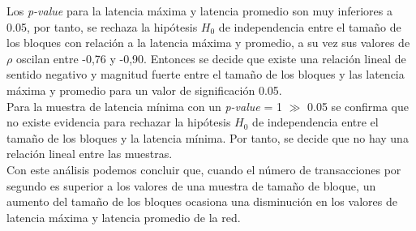 \newpage

Los \emph{p-value} para la latencia m\'axima y latencia promedio son muy inferiores a 0.05, por tanto, se rechaza la hip\'otesis $H_0$ de independencia entre el tama\~no de los bloques con relaci\'on a la latencia m\'axima y promedio, a su vez sus valores de $\rho$ oscilan entre -0,76 y -0,90. Entonces se decide que existe una relaci\'on lineal de sentido negativo y magnitud fuerte entre el tama\~no de los bloques y las latencia m\'axima y promedio para un valor de significaci\'on 0.05.\\

Para la muestra de latencia m\'inima con un \emph{p-value} = 1 $\gg$ 0.05 se confirma que no existe evidencia para rechazar la hip\'otesis $H_0$ de independencia entre el tama\~no de los bloques y la latencia m\'inima. Por tanto, se decide que no hay una relaci\'on lineal entre las muestras.\\

Con este an\'alisis podemos concluir que, cuando el n\'umero de transacciones por segundo es superior a los valores de una muestra de tama\~no de bloque, un aumento del tama\~no de los bloques ocasiona una disminuci\'on en los valores de latencia m\'axima y latencia promedio de la red.\\


